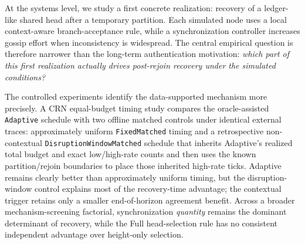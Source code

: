 \documentclass[11pt]{article}
\begin{document}
At the systems level, we study a first concrete realization: recovery of a ledger-like shared head after a temporary partition. Each simulated node uses a local context-aware branch-acceptance rule, while a synchronization controller increases gossip effort when inconsistency is widespread. The central empirical question is therefore narrower than the long-term authentication motivation: \emph{which part of this first realization actually drives post-rejoin recovery under the simulated conditions?}

The controlled experiments identify the data-supported mechanism more precisely. A CRN equal-budget timing study compares the oracle-assisted \texttt{Adaptive} schedule with two offline matched controls under identical external traces: approximately uniform \texttt{FixedMatched} timing and a retrospective non-contextual \texttt{DisruptionWindowMatched} schedule that inherits Adaptive's realized total budget and exact low/high-rate counts and then uses the known partition/rejoin boundaries to place those inherited high-rate ticks. Adaptive remains clearly better than approximately uniform timing, but the disruption-window control explains most of the recovery-time advantage; the contextual trigger retains only a smaller end-of-horizon agreement benefit. Across a broader mechanism-screening factorial, synchronization \emph{quantity} remains the dominant determinant of recovery, while the Full head-selection rule has no consistent independent advantage over height-only selection.
\end{document}
